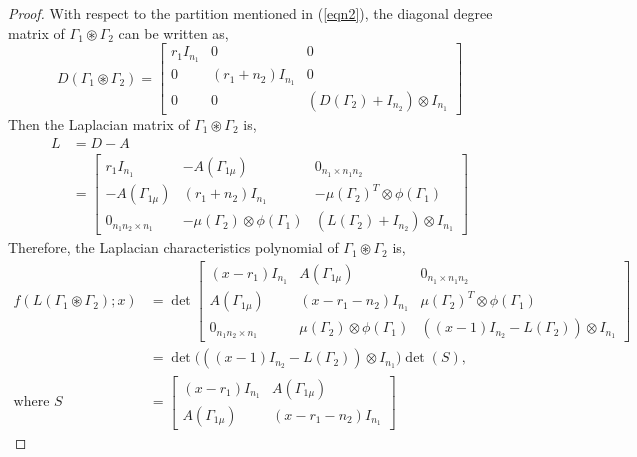 \documentclass[10pt,a4paper]{amsart}
\begin{document}
    \begin{proof}
        With respect to the partition mentioned in (\ref{eqn2}), the diagonal degree matrix of $\Gamma_1\circledast\Gamma_2$ can be written as, 
        $$D(\Gamma_1\circledast\Gamma_2)=\begin{bmatrix}
            r_1I_{n_1}& 0& 0\\
            0& (r_1+n_2)I_{n_1}& 0\\
            0& 0& (D(\Gamma_2)+I_{n_2})\otimes I_{n_1}
        \end{bmatrix}$$
        Then the Laplacian matrix of $\Gamma_1\circledast\Gamma_2$ is, 
        \begin{equation*}
            \begin{split}
                L&=D-A\\
                &=\begin{bmatrix}
                  r_1I_{n_1}& -A(\Gamma_{1\mu})& 0_{n_1\times n_1n_2}\\ 
            -A(\Gamma_{1\mu})& (r_1+n_2)I_{n_1}& -\mu(\Gamma_2)^T\otimes\phi(\Gamma_1)\\
            0_{n_1n_2\times n_1}& -\mu(\Gamma_2)\otimes\phi(\Gamma_1)& (L(\Gamma_2)+I_{n_2})\otimes I_{n_1}
                \end{bmatrix}
            \end{split}
        \end{equation*}
        Therefore, the Laplacian characteristics polynomial of $\Gamma_1\circledast\Gamma_2$ is,
        \begin{equation*}
            \begin{split}
                f(L(\Gamma_1\circledast\Gamma_2);x)&=\det\begin{bmatrix}
                    (x-r_1)I_{n_1}& A(\Gamma_{1\mu})& 0_{n_1\times n_1n_2}\\ 
            A(\Gamma_{1\mu})& (x-r_1-n_2)I_{n_1}& \mu(\Gamma_2)^T\otimes\phi(\Gamma_1)\\
            0_{n_1n_2\times n_1}& \mu(\Gamma_2)\otimes\phi(\Gamma_1)& ((x-1)I_{n_2}-L(\Gamma_2))\otimes I_{n_1}
                \end{bmatrix}\\
                &=\det\big(((x-1)I_{n_2}-L(\Gamma_2))\otimes I_{n_1}\big) \det(S),\\
                \text{where } S&=\begin{bmatrix}
                    (x-r_1)I_{n_1}& A(\Gamma_{1\mu})\\ 
            A(\Gamma_{1\mu})& (x-r_1-n_2)I_{n_1}

\end{bmatrix}
\end{split}
\end{equation*}
\end{proof}
\end{document}
